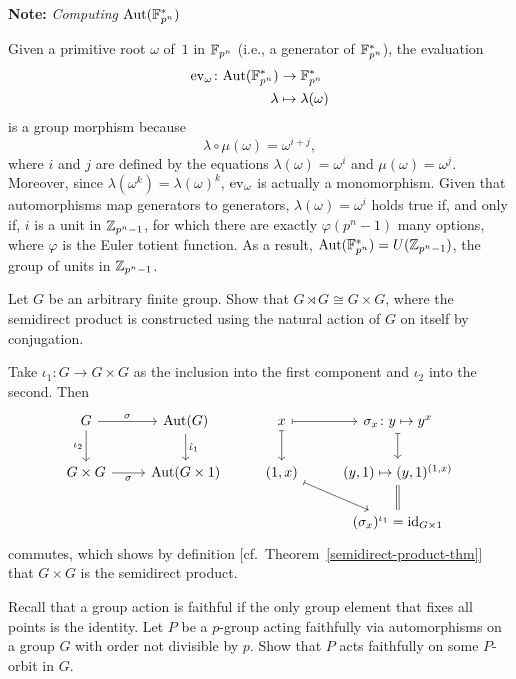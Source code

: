\begin{solution}
\medskip


\needspace{2\lineskip}
\textbf{Note:} \textit{Computing\/ ${\rm Aut}(\mathbb{F}_{p^{n}}^*)$}

Given a primitive root $\omega$ of~$1$ in $\mathbb{F}_{p^{n}}$ (i.e., a generator of $\mathbb{F}_{p^{n}}^*$), the evaluation
\begin{align*}
    {\rm ev}_{\omega}\colon{\rm Aut}(\mathbb{F}_{p^{n}}^*)&\to\mathbb{F}_{p^{n}}^*\\
    \lambda&\mapsto \lambda(\omega)
\end{align*}
is a group morphism because
$$
    \lambda\circ\mu(\omega)=\omega^{i+j},
$$
where $i$ and $j$ are defined by the equations $\lambda(\omega)=\omega^i$ and $\mu(\omega)=\omega^j$. Moreover, since $\lambda(\omega^k)=\lambda(\omega)^k$, ${\rm ev}_{\omega}$ is actually a monomorphism. Given that automorphisms map generators to generators, $\lambda(\omega)=\omega^i$ holds true if, and only if, $i$ is a unit in $\mathbb{Z}_{p^n-1}$, for which there are exactly $\varphi(p^n-1)$ many options, where $\varphi$ is the Euler totient function. As a result, ${\rm Aut}(\mathbb{F}_{p^{n}}^*)=U(\mathbb{Z}_{p^n-1})$, the group of units in $\mathbb{Z}_{p^n-1}$.

\begin{probl}
    Let\/ $G$ be an arbitrary finite group. Show that\/ $G \rtimes G \cong G \times G$, where the semidirect product is constructed using the natural action of\/ $G$ on itself by conjugation.
\end{probl}

\begin{solution} Take $\iota_1\colon G\to G\times G$ as the inclusion into the first component and $\iota_2$ into the second. Then
$$
    \begin{tikzcd}
        G \arrow[d,"\iota_2"']\arrow[r,"\sigma"]
            &\Aut(G)\arrow[d, "\hat\iota_1"]
            &x \arrow[d, maps to] \arrow[r, maps to]
            &\sigma_x\colon y\mapsto y^x \arrow[d, maps to] \\
        G\times G\arrow[r,"\sigma"']
            &\Aut(G\times 1)
            &{(1,x)}\arrow[rd, maps to]
            &{(y,1)\mapsto(y,1)^{(1,x)}}\\
        &&&(\sigma_x)^{\iota_1}=\id_{G\times1}\arrow[u,equal]
    \end{tikzcd}
$$
commutes, which shows by definition [cf.~Theorem~\ref{semidirect-product-thm}] that $G\times G$ is the semidirect product.  \end{solution}

\begin{probl}
    Recall that a group action is faithful if the only group element that fixes all points is the identity. Let\/ $P$ be a\/ $p$-group acting faithfully via automorphisms on a group\/ $G$ with order not divisible by\/ $p$. Show that\/ $P$ acts faithfully on some\/ $P$-orbit in\/ $G$.


\end{probl}
\end{solution}
